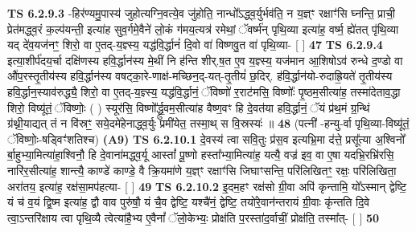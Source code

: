 \documentclass[17pt]{extarticle}
\begin{document}
                  \newline
                                \textbf{ TS 6.2.9.3} \newline
                  -हिर॑ण्यमु॒पास्य॑ जुहोत्यग्नि॒वत्ये॒व जु॑होति॒ नान्धो᳚ऽद्ध्व॒र्युर्भव॑ति॒ न य॒ज्ञ्ꣳ रक्षाꣳ॑सि घ्नन्ति॒ प्राची॒ प्रेत॑मद्ध्व॒रं क॒ल्प॑यन्ती॒ इत्या॑ह सुव॒र्गमे॒वैने॑ लो॒कं ग॑मय॒त्यत्र॑ रमेथां॒ ॅवर्ष्म॑न् पृथि॒व्या इत्या॑ह॒ वर्ष्म॒ ह्ये॑तत् पृ॑थि॒व्या यद् दे॑व॒यज॑नꣳ॒॒ शिरो॒ वा ए॒तद्-य॒ज्ञ्स्य॒ यद्ध॑वि॒र्द्धानं॑ दि॒वो वा॑ विष्णवु॒त वा॑ पृथि॒व्या- [  ] \textbf{  47} \newline
                  \newline
                                \textbf{ TS 6.2.9.4} \newline
                  इत्या॒शीर्प॑दय॒र्चा दक्षि॑णस्य हवि॒र्द्धान॑स्य मे॒थीं नि ह॑न्ति शीर्.ष॒त ए॒व य॒ज्ञ्स्य॒ यज॑मान आ॒शिषोऽव॑ रुन्धे द॒ण्डो वा औ॑प॒रस्तृ॒तीय॑स्य हवि॒र्द्धान॑स्य वषट्का॒रे-णाक्ष॑-मच्छिन॒द्-यत्-तृ॒तीयं॑ छ॒दिर्. ह॑वि॒र्द्धान॑यो-रुदाह्रि॒यते॑ तृ॒तीय॑स्य हवि॒र्द्धान॒स्याव॑रुद्ध्यै॒ शिरो॒ वा ए॒तद्-य॒ज्ञ्स्य॒ यद्ध॑वि॒र्द्धानं॒ ॅविष्णो॑ र॒राट॑मसि॒ विष्णोः᳚ पृ॒ष्ठम॒सीत्या॑ह॒ तस्मा॑देताव॒द्धा शिरो॒ विष्यू॑तं॒ ॅविष्णोः॒ ( ) स्यूर॑सि॒ विष्णो᳚र्द्ध्रु॒वम॒सीत्या॑ह वैष्ण॒वꣳ हि दे॒वत॑या हवि॒र्द्धानं॒ ॅयं प्र॑थ॒मं ग्र॒न्थिं ग्र॑थ्नी॒याद्यत् तं न वि॑स्रꣳ॒॒ सये॒दमे॑हेनाद्ध्व॒र्युः प्रमी॑येत॒ तस्मा॒थ् स वि॒स्रस्यः॑ ॥ \textbf{  48 } \newline
                  \newline
                      (पत्नी॑ -हन्यु-र्वा पृथि॒व्या-विष्यू॑तं॒ ॅविष्णोः॒-षड्विꣳ॑शतिश्च)  \textbf{(A9)} \newline \newline
                                        \textbf{ TS 6.2.10.1} \newline
                  दे॒वस्य॑ त्वा सवि॒तुः प्र॑स॒व इत्यभ्रि॒मा द॑त्ते॒ प्रसू᳚त्या अ॒श्विनो᳚ र्बा॒हुभ्या॒मित्या॑हा॒श्विनौ॒ हि दे॒वाना॑मद्ध्व॒र्यू आस्तां᳚ पू॒ष्णो हस्ता᳚भ्या॒मित्या॑ह॒ यत्यै॒ वज्र॑ इव॒ वा ए॒षा यदभ्रि॒रभ्रि॑रसि॒ नारि॑र॒सीत्या॑ह॒ शान्त्यै॒ काण्डे॑ काण्डे॒ वै क्रि॒यमा॑णे य॒ज्ञ्ꣳ रक्षाꣳ॑सि जिघाꣳसन्ति॒ परि॑लिखितꣳ॒॒ रक्षः॒ परि॑लिखिता॒ अरा॑तय॒ इत्या॑ह॒ रक्ष॑सा॒मप॑हत्या- [  ] \textbf{  49} \newline
                  \newline
                                \textbf{ TS 6.2.10.2} \newline
                  इ॒दम॒हꣳ रक्ष॑सो ग्री॒वा अपि॑ कृन्तामि॒ यो᳚ऽस्मान् द्वेष्टि॒ यं च॑ व॒यं द्वि॒ष्म इत्या॑ह॒ द्वौ वाव पुरु॑षौ॒ यं चै॒व द्वेष्टि॒ यश्चै॑नं॒ द्वेष्टि॒ तयो॑रे॒वान॑न्तरायं ग्री॒वाः कृ॑न्तति दि॒वे त्वा॒ऽन्तरि॑क्षाय त्वा पृथि॒व्यै त्वेत्या॑है॒भ्य ए॒वैनां᳚ ॅलो॒केभ्यः॒ प्रोक्ष॑ति प॒रस्ता॑द॒र्वाचीं॒ प्रोक्ष॑ति॒ तस्मा᳚त्- [  ] \textbf{  50} \newline
\end{document}
